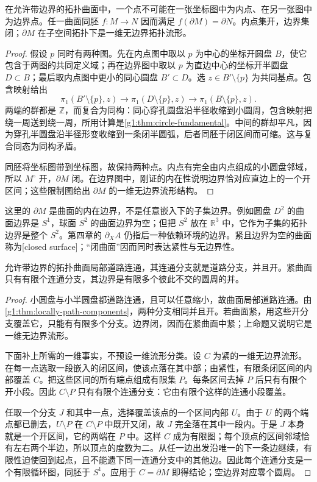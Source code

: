 \begin{proposition}\label{g1:prop:boundary-invariance}
	在允许带边界的拓扑曲面中，一个点不可能在一张坐标图中为内点、在另一张图中为边界点。任一曲面同胚 \(f:M\to N\) 因而满足 \(f(\partial M)=\partial N\)。内点集开，边界集闭；\(\partial M\) 在子空间拓扑下是一维无边界拓扑流形。
\end{proposition}
\begin{proof}
	假设 \(p\) 同时有两种图。先在内点图中取以 \(p\) 为中心的坐标开圆盘 \(B\)，使它包含于两图的共同定义域；再在边界图中取以 \(p\) 为直边中心的坐标开半圆盘 \(D\subset B\)；最后取内点图中更小的同心圆盘 \(B'\subset D\)。选 \(z\in B'\setminus\{p\}\) 为共同基点。包含映射给出
	\[
		\pi_1(B'\setminus\{p\},z)\longrightarrow
		\pi_1(D\setminus\{p\},z)\longrightarrow
		\pi_1(B\setminus\{p\},z).
	\]
	两端的群都是 \(\mathbb Z\)，而复合为同构：同心穿孔圆盘沿半径收缩到小圆周，包含映射把绕一周送到绕一周，所用计算是\cref{g1:thm:circle-fundamental}。中间的群却平凡，因为穿孔半圆盘沿半径形变收缩到一条闭半圆弧，后者同胚于闭区间而可缩。这与复合同态为同构矛盾。

	同胚将坐标图带到坐标图，故保持两种点。内点有完全由内点组成的小圆盘邻域，所以 \(M^\circ\) 开，\(\partial M\) 闭。在边界图中，刚证的内在性说明边界恰对应直边上的一个开区间；这些限制图给出 \(\partial M\) 的一维无边界流形结构。
\end{proof}

这里的 \(\partial M\) 是曲面的内在边界，不是任意嵌入下的子集边界。例如圆盘 \(D^2\) 的曲面边界是 \(S^1\)，球面 \(S^2\) 的曲面边界为空；但把 \(S^2\) 放在 \(\mathbb R^3\) 中，它作为子集的拓扑边界是整个 \(S^2\)。第四章的 \(\partial_X A\) 仍指后一种依赖环境的边界。紧且边界为空的曲面称为[closed surface]；“闭曲面”因而同时表达紧性与无边界性。

\begin{proposition}\label{g1:prop:boundary-circles}
	允许带边界的拓扑曲面局部道路连通，其连通分支就是道路分支，并且开。紧曲面只有有限个连通分支，其边界是有限多个彼此不交的圆周的并。
\end{proposition}
\begin{proof}
	小圆盘与小半圆盘都道路连通，且可以任意缩小，故曲面局部道路连通。由\cref{g1:thm:locally-path-components}，两种分支相同并且开。若曲面紧，用这些开分支覆盖它，只能有有限多个分支。边界闭，因而在紧曲面中紧；上命题又说明它是一维无边界流形。

	下面补上所需的一维事实，不预设一维流形分类。设 \(C\) 为紧的一维无边界流形。在每一点选取一段嵌入的闭区间，使该点落在其中部；由紧性，有限条闭区间的内部覆盖 \(C\)。把这些区间的所有端点组成有限集 \(P\)。每条区间去掉 \(P\) 后只有有限个开小段。因此 \(C\setminus P\) 只有有限个连通分支：它由有限个这样的连通小段覆盖。

	任取一个分支 \(J\) 和其中一点，选择覆盖该点的一个区间内部 \(U\)。由于 \(U\) 的两个端点都已删去，\(U\setminus P\) 在 \(C\setminus P\) 中既开又闭，故 \(J\) 完全落在其中一段内。于是 \(J\) 本身就是一个开区间，它的两端在 \(P\) 中。这样 \(C\) 成为有限图；每个顶点的区间邻域恰有左右两个半边，所以顶点的度数为二。从任一边出发沿唯一的下一条边继续，有限性迫使回到起点，且不能遗下同一连通分支中的其他边。因此每个连通分支是一个有限循环图，同胚于 \(S^1\)。应用于 \(C=\partial M\) 即得结论；空边界对应零个圆周。
\end{proof}

